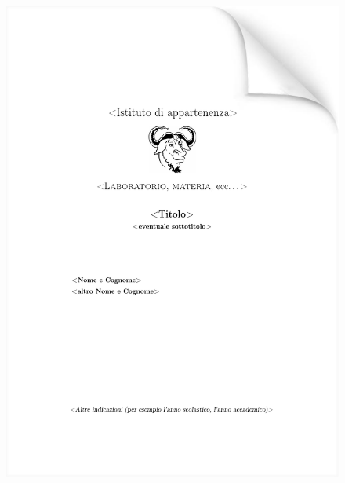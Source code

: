 \begin{landscape}
\begin{figure}[htp]
	\centering
		\includegraphics[width=0.65\textheight]{figure/frontpage_1.pdf}%
\hfill

\end{figure}
\end{landscape}
